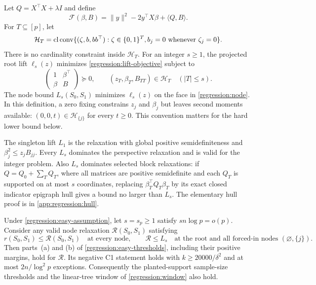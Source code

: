 Let $Q=X^\top X+\lambda I$ and define
\begin{equation}\label{regression:lift-objective}
 \mathcal F(\beta,B)=\|y\|^2-2y^\top X\beta+\langle Q,B\rangle.
\end{equation}
For $T\subseteq[p]$, let
\begin{equation}\label{regression:local-hull}
 \mathcal H_T=\operatorname{cl}\operatorname{conv}
 \{(\zeta,b,bb^\top):\zeta\in\{0,1\}^T,
                    b_j=0\text{ whenever }\zeta_j=0\}.
\end{equation}
There is no cardinality constraint inside $\mathcal H_T$.
For an integer $s\geq1$, the projected root lift $\ell_s(z)$ minimizes
\eqref{regression:lift-objective} subject to
\begin{equation}\label{regression:local-lift}
 \begin{pmatrix}1&\beta^\top\\\beta&B\end{pmatrix}\succeq0,
 \qquad (z_T,\beta_T,B_{TT})\in\mathcal H_T\quad(|T|\leq s).
\end{equation}
The node bound $L_s(S_0,S_1)$ minimizes $\ell_s(z)$ on the face in
\eqref{regression:node}. In this definition, a zero fixing constrains
$z_j$ and $\beta_j$ but leaves second moments available:
$(0,0,t)\in\mathcal H_{\{j\}}$ for every $t\geq0$.
This convention matters for the hard lower bound below.

The singleton lift $L_1$ is the relaxation with global positive
semidefiniteness and $\beta_j^2\leq z_jB_{jj}$.
Every $L_s$ dominates the perspective relaxation and is valid for the
integer problem. Also $L_s$ dominates selected block relaxations:
if $Q=Q_0+\sum_TQ_T$, where all matrices are positive semidefinite and
each $Q_T$ is supported on at most $s$ coordinates, replacing
$\beta_T^\top Q_T\beta_T$ by its exact closed indicator epigraph hull
gives a bound no larger than $L_s$. The elementary hull proof is in
\cref{app:regression:hull}.

\begin{theorem}
\label{regression:lift-thresholds}
Under \cref{regression:easy-assumption}, let $s=s_p\geq1$ satisfy
$s n\log p=o(p)$. Consider any valid node relaxation
$\mathcal R(S_0,S_1)$ satisfying
\begin{equation}\label{regression:lift-sandwich}
 r(S_0,S_1)\leq\mathcal R(S_0,S_1)
 \quad\text{at every node},\qquad
 \mathcal R\leq L_s
 \quad\text{at the root and all forced-in nodes }(\varnothing,\{j\}).
\end{equation}
Then parts~(a) and (b) of \cref{regression:easy-thresholds}, including
their positive margins, hold for $\mathcal R$. Its negative C1 statement
holds with $k\geq20000/\delta^2$ and at most $2n/\log^2p$ exceptions.
Consequently the planted-support sample-size thresholds and the
linear-tree window of \cref{regression:window} also hold.
\end{theorem}

